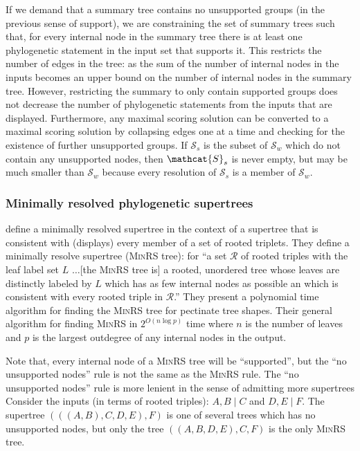 \documentclass[11pt]{article}
\newcommand{\ps}{phylogenetic statement\xspace}
\newcommand{\pss}{phylogenetic statements\xspace}
\begin{document}
If we demand that a summary tree contains no unsupported groups (in the previous sense of support), we 
    are constraining the set of summary trees such that, for every internal node in the summary tree
    there is at least one \ps in the input set that supports it.
This restricts the number of edges in the tree: as the sum of the number of internal nodes in the inputs becomes an upper bound
    on the number of internal nodes in the summary tree.
However, restricting the summary to only contain supported groups does not decrease the 
    number of \pss from the inputs that are displayed.
Furthermore, any maximal scoring solution can be converted to a maximal scoring
    solution by collapsing edges one at a time and checking for the existence of further
    unsupported groups.
If $\mathcal{S}_s$ is the subset of $\mathcal{S}_w$ which do not contain any unsupported nodes,
    then $\mathcat{S}_s$ is never empty, but may be much smaller than $\mathcal{S}_w$ because
    every resolution of $\mathcal{S}_s$ is a member of $\mathcal{S}_w$.

\subsubsection{Minimally resolved phylogenetic supertrees} \label{minrs}
\citet{JanssonLL2012} define a minimally resolved supertree in the context of 
    a supertree that is consistent with (displays) every member of a set of 
    rooted triplets.
They define a minimally resolve supertree (\textsc{MinRS} tree): for ``a set $\mathcal{R}$ of rooted 
    triples with the leaf label set $L$ $\ldots$[the \textsc{MinRS} tree is] a 
    rooted, unordered tree whose leaves are distinctly labeled by $L$ which has as few internal
    nodes as possible an which is consistent with every rooted triple in $\mathcal{R}$.''
They present a polynomial time algorithm for finding the \textsc{MinRS} tree for pectinate tree shapes.
Their general algorithm for finding \textsc{MinRS} in $2^{O(n\log p)}$ time where $n$ is the number of 
    leaves and $p$ is the largest outdegree of any internal nodes in the output.

Note that, every internal node of a \textsc{MinRS} tree will be ``supported'', but the
    ``no unsupported nodes'' rule is not the same as the \textsc{MinRS} rule.
The ``no unsupported nodes'' rule is more lenient in the sense of admitting more supertrees
Consider the inputs (in terms of rooted triples): $A,B\mid C$ and $D,E\mid F$.
The supertree $(((A,B),C,D,E),F)$ is one of several trees which has no unsupported nodes, but 
    only the tree $((A,B,D,E),C,F)$ is the only \textsc{MinRS} tree.
\end{document}
